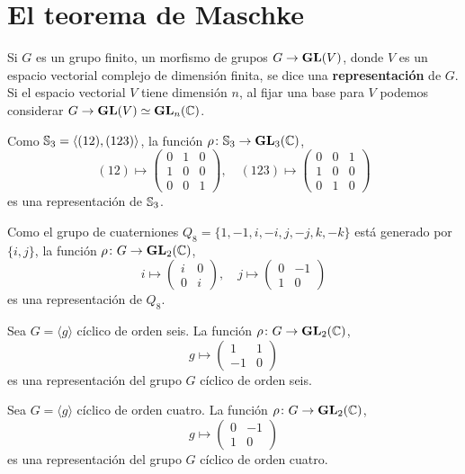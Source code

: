\chapter{El teorema de Maschke}

Si $G$ es un grupo finito, un morfismo de grupos $G\to\mathbf{GL}(V)$, donde $V$ es un espacio
vectorial complejo de dimensión finita, se dice una 
\textbf{representación} de $G$. Si el espacio vectorial $V$ tiene dimensión $n$, al fijar una base 
para $V$ podemos considerar $G\to\mathbf{GL}(V)\simeq\mathbf{GL}_n(\mathbb{C})$.
 
\begin{example}
Como $\mathbb{S}_3=\langle (12),(123)\rangle$, la función $\rho\colon \mathbb{S}_3\to\mathbf{GL}_3(\mathbb{C})$,
\[
(12)\mapsto\begin{pmatrix}
0 & 1 & 0\\
1 & 0 & 0\\
0 & 0 & 1
\end{pmatrix},\quad
(123)\mapsto\begin{pmatrix}
0 & 0 & 1\\
1 & 0 & 0\\
0 & 1 & 0
\end{pmatrix}
\] 
es una representación de $\mathbb{S}_3$. 
\end{example}

\begin{example}
Como el grupo de cuaterniones $Q_8=\{1,-1,i,-i,j,-j,k,-k\}$ está generado por $\{i,j\}$, 
la función $\rho\colon G\to\mathbf{GL}_2(\mathbb{C})$, 
\[
i\mapsto\begin{pmatrix}
i & 0\\
0 & i
\end{pmatrix},
\quad
j\mapsto\begin{pmatrix}
0 & -1\\
1 & 0	
\end{pmatrix}
\]
es una representación de $Q_8$.
\end{example}

\begin{example}
Sea $G=\langle g\rangle$ cíclico de orden seis. 
La función $\rho\colon G\to\mathbf{GL}_2(\mathbb{C})$, 
\[
g\mapsto
\begin{pmatrix}
1&1\\
-1&0
\end{pmatrix}
\] 
es una representación del grupo $G$ cíclico de orden seis. 
\end{example}

\begin{example}
Sea $G=\langle g\rangle$ cíclico de orden cuatro. 
La función $\rho\colon G\to\mathbf{GL}_2(\mathbb{C})$, 
\[
g\mapsto
\begin{pmatrix}
0&-1\\
1&0
\end{pmatrix}
\] 
es una representación del grupo $G$ cíclico de orden cuatro. 
\end{example}

